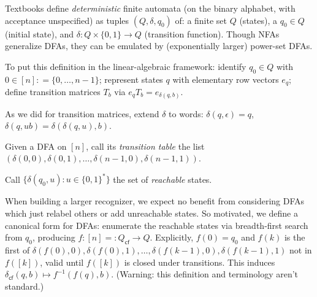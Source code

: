 Textbooks define \emph{deterministic} finite automata (on the binary alphabet, with acceptance unspecified) as tuples $(Q, \delta, q_0)$ of: a finite set $Q$ (states), a $q_0\in Q$ (initial state), and $\delta: Q\times\{0, 1\}\to Q$ (transition function).
Though NFAs generalize DFAs, they can be emulated by (exponentially larger) power-set DFAs. \cite{Sipser}

To put this definition in the linear-algebraic framework:
identify $q_0\in Q$ with $0\in [n]\mathrel{\mathop:}=\{0,\ldots,n-1\}$;
represent states $q$ with elementary row vectors $e_q$;
define transition matrices $T_b$ via $e_q T_b = e_{\delta(q, b)}$.

As we did for transition matrices, extend $\delta$ to words: $\delta(q,\epsilon)=q$, $\delta(q,ub)=\delta(\delta(q,u),b)$.

Given a DFA on $[n]$, call its \emph{transition table} the list $(\delta(0,0),\delta(0,1),\ldots,\delta(n-1,0),\delta(n-1,1))$.

Call $\{\delta(q_0,u): u\in\{0,1\}^*\}$ the set of \emph{reachable} states.

When building a larger recognizer,
we expect no benefit from considering DFAs which just relabel others or add unreachable states.
So motivated, we define a canonical form for DFAs:
enumerate the reachable states via breadth-first search from $q_0$,
producing $f:[n]=\mathrel{\mathop:}Q_\textsf{cf}\to Q$.
Explicitly,
$f(0)=q_0$ and $f(k)$ is the first of
$\delta(f(0),0), \delta(f(0),1), \ldots, \delta(f(k-1),0), \delta(f(k-1),1)$ not in $f([k])$,
valid until $f([k])$ is closed under transitions.
This induces $\delta_\textsf{cf}(q,b)\mapsto f^{-1}(f(q), b)$.
(Warning: this definition and terminology aren't standard.)


